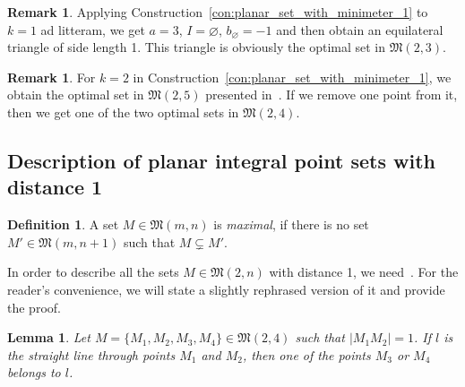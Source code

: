 \documentclass[a4paper,14pt]{article} %
\theoremstyle{plain}
\newtheorem{lemma}[theorem]{Lemma}
\theoremstyle{definition}
\newtheorem{definition}[theorem]{Definition}
\newtheorem{remark}[theorem]{Remark}
\begin{document}
\begin{remark}
	\label{rem:planar_set_with_minimeter_1_of_3_points}
	Applying Construction~\ref{con:planar_set_with_minimeter_1} to $k=1$ ad litteram,
	we get $a = 3$, $I=\varnothing$, $b_\varnothing = -1$ and then
	obtain an equilateral triangle of side length 1.
	This triangle is obviously the optimal set in $\mathfrak{M}(2,3)$.
\end{remark}

\begin{remark}
	\label{rem:planar_set_with_minimeter_1_of_4_and_5_points}
	For $k=2$ in Construction~\ref{con:planar_set_with_minimeter_1},
	we obtain the optimal set in $\mathfrak{M}(2,5)$ presented in~\cite[Fig. 1]{harborth1993upper}.
	If we remove one point from it,
	then we get one of the two optimal sets in $\mathfrak{M}(2,4)$.
\end{remark}

\subsection{Description of planar integral point sets with distance 1}

\begin{definition}
	\cite{antonov2008maximal}
	A set $M\in \mathfrak{M}(m,n)$ is \textit{maximal},
	if there is no set $M'\in \mathfrak{M}(m,n+1)$
	such that $M \subsetneq M'$.
\end{definition}





In order to describe all the sets $M \in \mathfrak{M}(2,n)$ with distance 1,
we need~\cite[Proposition 6]{our-vmmsh-2018-translit}.
For the reader's convenience, we will state a slightly rephrased version of it and provide the proof.
\begin{lemma}
	\label{lem:no_4_points_in_semigeneral_position_with_distance_1}
	Let $M=\{M_1,M_2,M_3,M_4\}\in \mathfrak{M}(2,4)$ such that $|M_1 M_2|=1$.
	If $l$ is the straight line through points $M_1$ and $M_2$,
	then one of the points $M_3$ or $M_4$ belongs to $l$.
\end{lemma}
\end{document}
